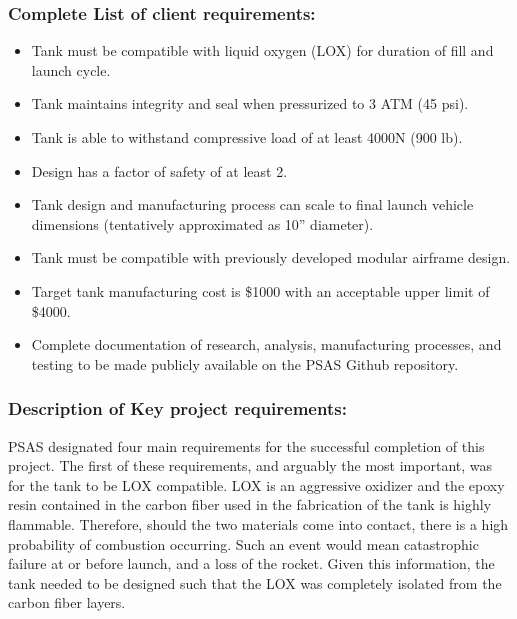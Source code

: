\subsubsection{Complete List of client requirements:}
\begin{itemize}[nolistsep]
\item Tank must be compatible with liquid oxygen (LOX) for duration of fill and launch cycle.

\item Tank maintains integrity and seal when pressurized to 3 ATM (45 psi).

\item Tank is able to withstand compressive load of at least 4000N (900 lb).

\item Design has a factor of safety of at least 2.

\item Tank design and manufacturing process can scale to final launch vehicle dimensions (tentatively approximated as 10” diameter).

\item Tank must be compatible with previously developed modular airframe design.

\item Target tank manufacturing cost is \$1000 with an acceptable upper limit of \$4000. 

\item Complete documentation of research, analysis, manufacturing processes, and testing to be made publicly available on the PSAS Github repository.

\end{itemize}

\subsubsection{Description of Key project requirements:}

PSAS designated four main requirements for the successful completion of this project. The first of these requirements, and arguably the most important, was for the tank to be LOX compatible. LOX is an aggressive oxidizer and the epoxy resin contained in the carbon fiber used in the fabrication of the tank is highly flammable. Therefore, should the two materials come into contact, there is a high probability of combustion occurring. Such an event would mean catastrophic failure at or before launch, and a loss of the rocket. Given this information, the tank needed to be designed such that the LOX was completely isolated from the carbon fiber layers.

